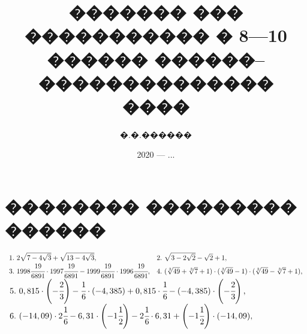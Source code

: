 \documentclass[12pt]{article}
\author{�.�.������}
\title{������� ��� ����������� � 8---10 ������ ������--�������������� ����}
\date{2020 --- ...}
\begin{document}
\maketitle
\newpage
\tableofcontents
\newpage
\section{�������� ��������� ������}
$\begin{array}{ll}
1.\ 2\sqrt{7-4\sqrt{3}}+\sqrt{13-4\sqrt{3}},&
2.\ \sqrt{3-2\sqrt{2}}-\sqrt{2}+1,\\
3.\ 1998\cfrac{19}{6891}\cdot1997\cfrac{19}{6891}-1999\cfrac{19}{6891}\cdot1996\cfrac{19}{6891},&
4.\ (\sqrt[3]{49}+\sqrt[3]{7}+1)\cdot(\sqrt[3]{49}-1)\cdot(\sqrt[3]{49}-\sqrt[3]{7}+1),
\end{array}$\\
$\begin{array}{l}
5.\ 0,815\cdot\left(-\cfrac{2}{3}\right)-\cfrac{1}{6}\cdot(-4,385)+0,815\cdot\cfrac{1}{6}-(-4,385)\cdot\left(-\cfrac{2}{3}\right),\\
6.\ (-14,09)\cdot 2\cfrac{1}{6}-6,31\cdot\left(-1\cfrac{1}{2}\right)-2\cfrac{1}{6}\cdot6,31+\left(-1\cfrac{1}{2}\right)\cdot(-14,09),
\end{array}$\\
\end{document}
